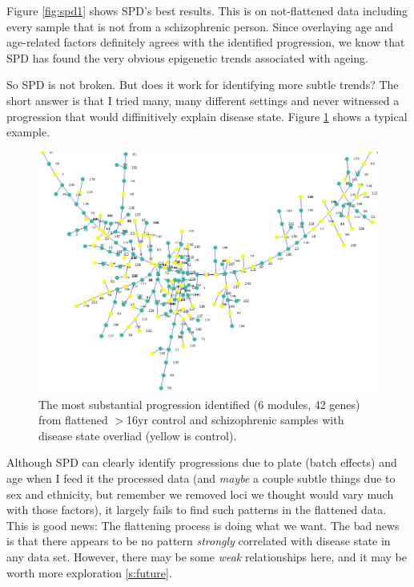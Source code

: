 \documentclass[]{article}
\begin{document}
  Figure \ref{fig:spd1} shows SPD's best results. This is on not-flattened data including every sample that is not from a schizophrenic person. Since overlaying age and age-related factors definitely agrees with the identified progression, we know that SPD has found the very obvious epigenetic trends associated with ageing.

  So SPD is not broken. But does it work for identifying more subtle trends? The short answer is that I tried many, many different settings and never witnessed a progression that would diffinitively explain disease state. Figure \ref{fig:spd2} shows a typical example.

  \begin{figure}[H]
    \centering
    \includegraphics[width=1\linewidth]{sz_control_dx.png}
    \caption{The most substantial progression identified (6 modules, 42 genes) from flattened $>$16yr control and schizophrenic samples with disease state overliad (yellow is control).}
    \label{fig:spd2}
  \end{figure}

  Although SPD can clearly identify progressions due to plate (batch effects) and age when I feed it the processed data (and \textit{maybe} a couple subtle things due to sex and ethnicity, but remember we removed loci we thought would vary much with those factors), it largely fails to find such patterns in the flattened data. This is good news: The flattening process is doing what we want. The bad news is that there appears to be no pattern \textit{strongly} correlated with disease state in any data set. However, there may be some \textit{weak} relationships here, and it may be worth more exploration \ref{s:future}.
 
\end{document}
